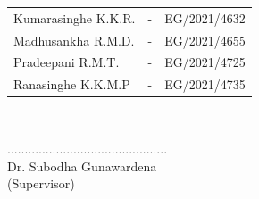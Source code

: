 \begin{center}
\begin{tabular}[h]{lll}
 Kumarasinghe K.K.R.	& - & 	EG/2021/4632\\
 Madhusankha R.M.D.	& - & 	EG/2021/4655\\
 Pradeepani R.M.T.	& - & 	EG/2021/4725\\
 Ranasinghe K.K.M.P 	& - &	EG/2021/4735
\end{tabular}\\
\vspace{1cm}

\vspace{1cm}

 .............................................. \\
Dr. Subodha Gunawardena\\
(Supervisor)






\end{center}

